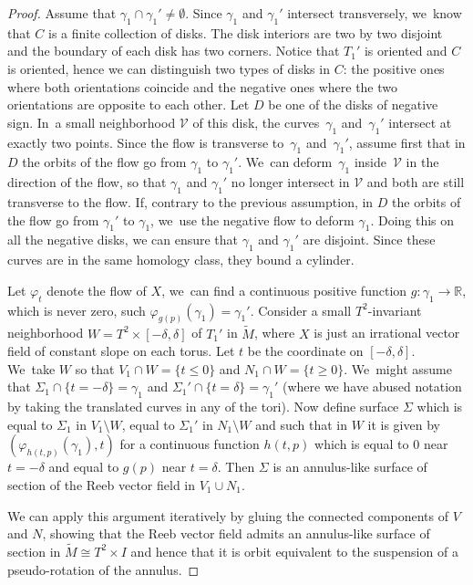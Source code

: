 \documentclass[JEP,XML,SOM,Unicode,NoEqCountersInSection,NoFloatCountersInSection,published]{cedram}
\theoremstyle{definition}
\begin{document}
\begin{proof}
Assume that $\gamma_1\cap \gamma_1' \neq \emptyset$. Since $\gamma_1$ and $\gamma_1'$ intersect transversely, we~know that $C$ is a finite collection of disks. The disk interiors are two by two disjoint and the boundary of each disk has two corners. Notice that $T_1'$ is oriented and $C$ is oriented, hence we can distinguish two types of disks in $C$: the positive ones where both orientations coincide and the negative ones where the two orientations are opposite to each other.
Let $D$ be one of the disks of negative sign. In~a small neighborhood $\mathcal{V}$ of this disk, the curves~$\gamma_1$ and~$\gamma_1'$ intersect at exactly two points. Since the flow is transverse to~$\gamma_1$ and~$\gamma_1'$, assume first that in $D$ the orbits of the flow go from $\gamma_1$ to $\gamma_1'$. We~can deform~$\gamma_1$ inside~$\mathcal{V}$ in the direction of the flow, so that $\gamma_1$ and $\gamma_1'$ no longer intersect in $\mathcal{V}$ and both are still transverse to the flow. If, contrary to the previous assumption, in $D$ the orbits of the flow go from $\gamma_1'$ to $\gamma_1$, we~use the negative flow to deform $\gamma_1$. Doing this on all the negative disks,
we can ensure that $\gamma_1$ and $\gamma_1'$ are disjoint. Since these curves are in the same homology class, they bound a cylinder.

Let $\varphi_t$ denote the flow of $X$, we~can find a continuous positive function $g: \gamma_1 \to \mathbb{R}$, which is never zero, such $\varphi_{g(p)}(\gamma_1)=\gamma_1'$. Consider a small $T^2$-invariant neighborhood $W=T^2\times [-\delta,\delta]$ of $T_1'$ in $\widetilde M$, where $X$ is just an irrational vector field of constant slope on each torus. Let $t$ be the coordinate on $[-\delta, \delta]$. We~take $W$ so that $V_1\cap W= \{t\leq 0\}$ and $N_1\cap W=\{t\geq 0\}$. We~might assume that $\Sigma_1\cap \{t=-\delta\}=\gamma_1$ and $\Sigma_1'\cap \{t=\delta\}=\gamma_1'$ (where we have abused notation by taking the translated curves in any of the tori). Now define surface $\Sigma$ which is equal to $\Sigma_1$ in $V_1\setminus W$, equal to $\Sigma_1'$ in $N_1\setminus W$ and such that in $W$ it is given by $(\varphi_{h(t,p)}(\gamma_1),t)$ for a continuous function $h(t,p)$ which is equal to $0$ near $t=-\delta$ and equal to $g(p)$ near $t=\delta$. Then $\Sigma$ is an annulus-like surface of section of the Reeb vector field in $V_1\cup N_1$.

We can apply this argument iteratively by gluing the connected components of $V$ and $N$, showing that the Reeb vector field admits an annulus-like surface of section in $\widetilde{M} \cong T^2\times I$ and hence that it is orbit equivalent to the suspension of a pseudo-rotation of the annulus.
\end{proof}
\end{document}
